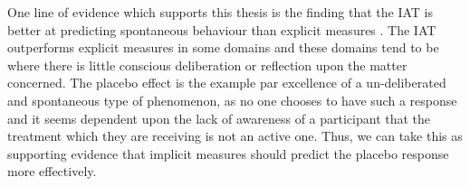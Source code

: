 

One line of evidence which supports this thesis is the finding that the IAT is better at predicting spontaneous behaviour than explicit measures \cite{Conner2005,Hofmann2005}. The IAT outperforms explicit measures in some domains \cite{Greenwald2009} and these domains tend to be where there is little conscious deliberation or reflection upon the matter concerned. The placebo effect is the example par excellence of a un-deliberated and spontaneous  type of phenomenon, as no one chooses to have such a response and it seems dependent upon the lack of awareness of a participant that the treatment which they are receiving is not an active one. Thus, we can take this as supporting evidence that implicit measures should predict the placebo response more effectively. 


